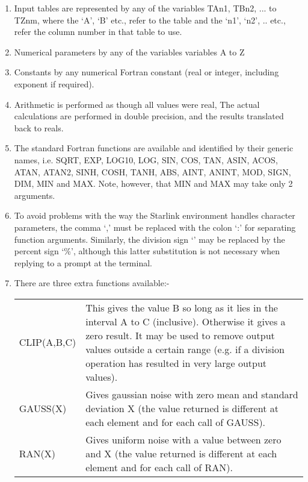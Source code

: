 {{ \begin{enumerate}  
 \item Input tables are represented by any of the variables TAn1, TBn2, ...
    to TZnm, where the `A', `B' etc., refer to the table and the `n1',
    `n2', .. etc., refer the column number in that table to use.
 \item Numerical parameters by any of the variables variables A to Z
 \item  Constants by any numerical Fortran constant (real or integer,
    including exponent if required).
 \item Arithmetic is performed as though all values were real, The actual
    calculations are performed in double precision, and the results
    translated back to reals.
 \item The standard Fortran functions are available and identified
    by their generic names, i.e. SQRT, EXP, LOG10, LOG, SIN, COS, TAN,
    ASIN, ACOS, ATAN, ATAN2, SINH, COSH, TANH, ABS, AINT, ANINT, MOD,
    SIGN, DIM, MIN and MAX. Note, however, that MIN and MAX may take only
    2 arguments.
 \item To avoid problems with the way the Starlink environment
    handles character parameters, the comma `,' must be replaced with
    the colon `:' for separating function arguments. Similarly, the
    division sign `\/' may be replaced by the percent sign `\%', although
    this latter substitution is not necessary when replying to a prompt
    at the terminal.
 \item There are three extra functions available:-

    \begin{tabular}{lp{4in}}
    CLIP(A,B,C) & This gives the value B so long as it lies in the
                 interval A to C (inclusive). Otherwise it gives a
                 zero result. It may be used to remove output values
                 outside a certain range (e.g. if a division operation
                 has resulted in very large output values). \\
    GAUSS(X)    & Gives gaussian noise with zero mean and standard
                 deviation X (the value returned is different at each
                 element and for each call of GAUSS). \\
    RAN(X)      & Gives uniform noise with a value between zero and X
                 (the value returned is different at each element and
                 for each call of RAN). \\
    \end{tabular}
  \end{enumerate}
                                                                               
}}

